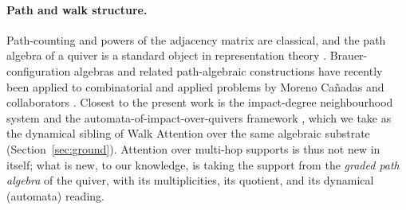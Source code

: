 \documentclass[runningheads]{llncs}
\begin{document}
\paragraph{Path and walk structure.}
Path-counting and powers of the adjacency matrix are classical, and the path
algebra of a quiver is a standard object in representation theory
\cite{schiffler2014quiver,assem2006elements}. Brauer-configuration algebras and
related path-algebraic constructions have recently been applied to combinatorial
and applied problems by Moreno Ca\~nadas and collaborators
\cite{moreno2021brauer,moreno2024integer}. Closest to the present work is the
impact-degree neighbourhood system and the automata-of-impact-over-quivers
framework \cite{zainea2026aiq,ibanez2025casimulations}, which we take as the
dynamical sibling of Walk Attention over the same algebraic substrate
(Section~\ref{sec:ground}). Attention over multi-hop supports is thus not new in
itself; what is new, to our knowledge, is taking the support from the
\emph{graded path algebra} of the quiver, with its multiplicities, its quotient,
and its dynamical (automata) reading.








\end{document}
